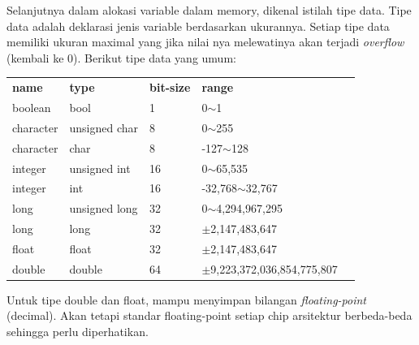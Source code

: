 \documentclass[12pt,]{article}
\begin{document}
	Selanjutnya dalam alokasi variable dalam memory, dikenal istilah tipe data.
	Tipe data adalah deklarasi jenis variable berdasarkan ukurannya.
	Setiap tipe data memiliki ukuran maximal yang jika nilai nya melewatinya akan terjadi \textit{overflow} (kembali ke 0).
	Berikut tipe data yang umum:
	\begin{table}[H]
		\begin{tabular}{|l|l|l|l|l}
			\cline{1-4}
			\textbf{name}      & \textbf{type}          & \textbf{bit-size} & \textbf{range}         &  \\ \cline{1-4}
			boolean   & bool          & 1  & 0$\sim$1             &  \\ \cline{1-4}
			character & unsigned char & 8  & 0$\sim$255           &  \\ \cline{1-4}
			character & char          & 8  & -127$\sim$128        &  \\ \cline{1-4}
			integer   & unsigned int  & 16 & 0$\sim$65,535        &  \\ \cline{1-4}
			integer   & int  		  & 16 & -32,768$\sim$32,767  &  \\ \cline{1-4}
			long	  & unsigned long & 32 & 0$\sim$4,294,967,295 &  \\ \cline{1-4}
			long	  & long 		  & 32 & $\pm$2,147,483,647	  &  \\ \cline{1-4}
			float	  & float 		  & 32 & $\pm$2,147,483,647	  &  \\ \cline{1-4}
			double	  & double 		  & 64 & $\pm$9,223,372,036,854,775,807	&  \\ \cline{1-4}
		\end{tabular}
	\end{table}
	Untuk tipe double dan float, mampu menyimpan bilangan \textit{floating-point} (decimal).
	Akan tetapi standar floating-point setiap chip arsitektur berbeda-beda sehingga perlu diperhatikan.
	
\end{document}
